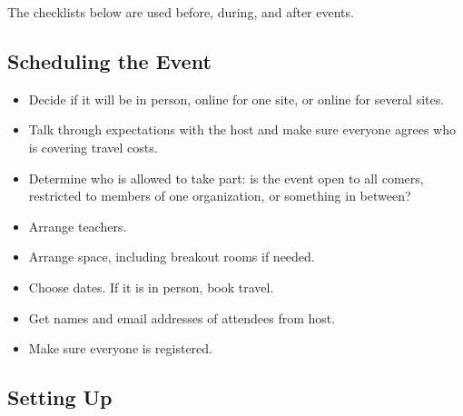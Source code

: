 
The checklists below are used before, during, and after events.

\subsection*{Scheduling the Event}

\begin{itemize}

\item
  Decide if it will be in person,
  online for one site,
  or online for several sites.

\item
  Talk through expectations with the host
  and make sure everyone agrees who is covering travel costs.

\item
  Determine who is allowed to take part:
  is the event open to all comers,
  restricted to members of one organization,
  or something in between?

\item
  Arrange teachers.

\item
  Arrange space, including breakout rooms if needed.

\item
  Choose dates.
  If it is in person, book travel.

\item
  Get names and email addresses of attendees from host.

\item
  Make sure everyone is registered.

\end{itemize}

\subsection*{Setting Up}

